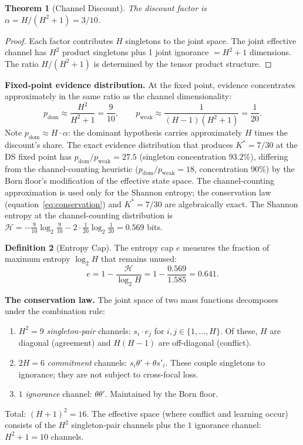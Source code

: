 \documentclass[11pt,a4paper]{article}
\newtheorem{theorem}{Theorem}[section]
\theoremstyle{definition}
\newtheorem{definition}[theorem]{Definition}
\theoremstyle{remark}
\begin{document}
\begin{theorem}[Channel Discount]\label{thm:discount}
The discount factor is $\alpha=H/(H^2+1)=3/10$.
\end{theorem}

\begin{proof}
Each factor contributes $H$ singletons to the joint space. The joint effective channel has $H^2$ product singletons plus 1 joint ignorance $=H^2+1$ dimensions. The ratio $H/(H^2+1)$ is determined by the tensor product structure.
\end{proof}

\textbf{Fixed-point evidence distribution.} At the fixed point, evidence concentrates approximately in the same ratio as the channel dimensionality:
\begin{equation}\label{eq:fpd}
p_{\mathrm{dom}}\approx\frac{H^2}{H^2+1}=\frac{9}{10},\qquad p_{\mathrm{weak}}\approx\frac{1}{(H-1)(H^2+1)}=\frac{1}{20}.
\end{equation}
Note $p_{\mathrm{dom}}\approx H\cdot\alpha$: the dominant hypothesis carries approximately $H$ times the discount's share. The exact evidence distribution that produces $K^*=7/30$ at the DS fixed point has $p_{\mathrm{dom}}/p_{\mathrm{weak}}=27.5$ (singleton concentration $93.2\%$), differing from the channel-counting heuristic ($p_{\mathrm{dom}}/p_{\mathrm{weak}}=18$, concentration $90\%$) by the Born floor's modification of the effective state space. The channel-counting approximation is used only for the Shannon entropy; the conservation law (equation~\ref{eq:conservation}) and $K^*=7/30$ are algebraically exact. The Shannon entropy at the channel-counting distribution is $\mathcal{H}=-\frac{9}{10}\log_2\frac{9}{10}-2\cdot\frac{1}{20}\log_2\frac{1}{20}=0.569$ bits.

\begin{definition}[Entropy Cap]\label{def:entcap}
The entropy cap $e$ measures the fraction of maximum entropy $\log_2 H$ that remains unused:
\begin{equation}\label{eq:entcap}
e=1-\frac{\mathcal{H}}{\log_2 H}=1-\frac{0.569}{1.585}=0.641.
\end{equation}
\end{definition}

\textbf{The conservation law.} The joint space of two mass functions decomposes under the combination rule:
\begin{enumerate}[nosep]
\item $H^2=9$ \emph{singleton-pair} channels: $s_i\cdot e_j$ for $i,j\in\{1,\ldots,H\}$. Of these, $H$ are diagonal (agreement) and $H(H-1)$ are off-diagonal (conflict).
\item $2H=6$ \emph{commitment} channels: $s_i\theta'+\theta s'_i$. These couple singletons to ignorance; they are not subject to cross-focal loss.
\item $1$ \emph{ignorance} channel: $\theta\theta'$. Maintained by the Born floor.
\end{enumerate}
Total: $(H+1)^2=16$. The effective space (where conflict and learning occur) consists of the $H^2$ singleton-pair channels plus the $1$ ignorance channel: $H^2+1=10$ channels.
\end{document}
